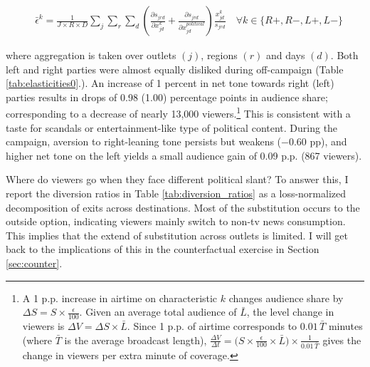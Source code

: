 \documentclass[12pt]{article}
\begin{document}
	
	\begin{equation}\label{eq:elasticities}
		\begin{aligned}
			& \bar{\epsilon}^k= \frac{1}{J\times R \times D}\sum_{j}\sum_{r} \sum_{d} \left(\frac{\partial s_{jrd}}{\partial x_{jd}^k} +  \frac{\partial s_{jrd}}{\partial x_{jd}^{political}} \right) \frac{x_{jd}^k}{s_{jrd}}    \quad \forall k \in \{R+,R-,L+,L-\}
		\end{aligned}
	\end{equation}             
	
	where aggregation is taken over outlets $(j)$, regions $(r)$ and days $(d)$.	Both left and right parties were almost equally disliked during off-campaign (Table \ref{tab:elasticities0}.). An increase of 1 percent in net tone  towards right (left) parties results in drops of 0.98 (1.00) percentage points in audience share; corresponding to a decrease of nearly 13,000 viewers.\footnote{A 1 p.p. increase in airtime on characteristic $k$ changes audience share by $\Delta S = S \times \tfrac{\epsilon}{100}$. Given an average total audience of $\bar{L}$, the level change in viewers is $\Delta V = \Delta S \times \bar{L}$. Since 1 p.p. of airtime corresponds to $0.01\,\bar{T}$ minutes (where $\bar{T}$ is the average broadcast length), $\tfrac{\Delta V}{\Delta t} = \bigl(S \times \tfrac{\epsilon}{100} \times \bar{L}\bigr) \times \tfrac{1}{0.01\,\bar{T}}$ gives the change in viewers per extra minute of coverage.} This is consistent with a taste for scandals or entertainment-like type of political content. During the campaign, aversion to right-leaning tone persists but weakens ($-0.60$ pp), and higher net tone on the left yields a small audience gain of 0.09 p.p. (867 viewers). 
	
Where do viewers go when they face different political slant? To answer this, I report the diversion ratios in Table \ref{tab:diversion_ratios} as a loss-normalized decomposition of exits across destinations. Most of the substitution occurs to the outside option, indicating viewers mainly switch to non-tv news consumption. This implies that the extend of substitution across outlets is limited. I will get back to the implications of this in the counterfactual exercise in Section \ref{sec:counter}.
	
\end{document}
